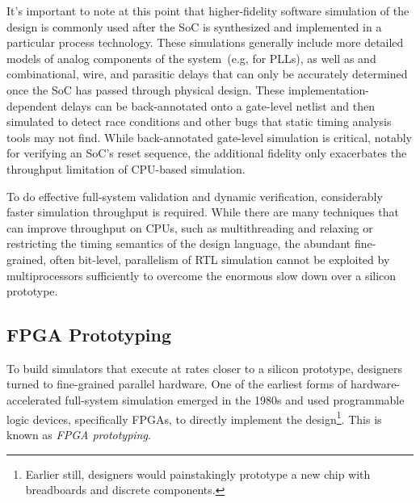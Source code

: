 It's important to note at this point that higher-fidelity software simulation
of the design is commonly used after the SoC is synthesized and implemented in
a particular process technology.  These simulations generally include more
detailed models of analog components of the system~(e.g, for PLLs), as well as
and combinational, wire, and parasitic delays that can only be accurately
determined once the SoC has passed through physical design.  These
implementation-dependent delays can be back-annotated onto a gate-level netlist
and then simulated to detect race conditions and other bugs that static timing
analysis tools may not find. While back-annotated gate-level simulation is
critical, notably for verifying an SoC's reset sequence, the additional
fidelity only exacerbates the throughput limitation of CPU-based simulation.

To do effective full-system validation and dynamic verification, considerably
faster simulation throughput is required. While there are many techniques that
can improve throughput on CPUs, such as multithreading and relaxing or restricting
the timing semantics of the design language, the abundant
fine-grained, often bit-level, parallelism of RTL simulation cannot be exploited
by multiprocessors sufficiently to overcome the enormous slow down over a
silicon prototype.

\subsection{FPGA Prototyping}\label{sec:fpga-prototyping}

To build simulators that execute at rates closer to a silicon prototype,
designers turned to fine-grained parallel hardware.  One of the earliest forms of
hardware-accelerated full-system simulation emerged in the 1980s and used
programmable logic devices, specifically FPGAs, to directly implement the
design\footnote{Earlier still, designers would painstakingly prototype a new chip
with breadboards and discrete components.}. This is known as \emph{FPGA prototyping}.

